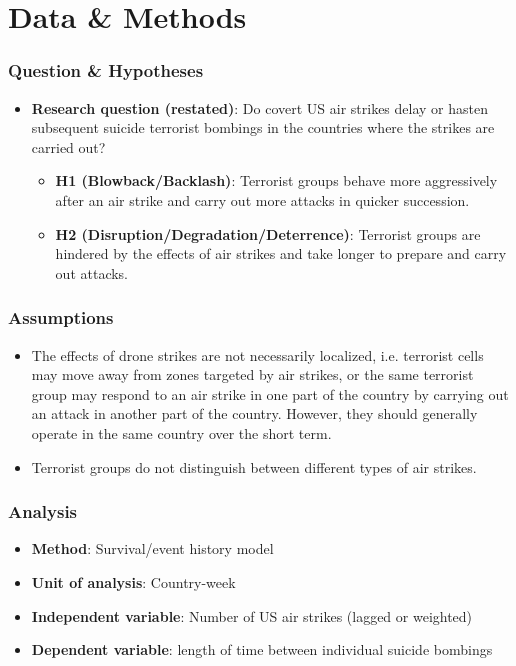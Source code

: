 \documentclass{beamer}
\begin{document}
\section{Data \& Methods}

  \begin{frame}
    \frametitle{Question \& Hypotheses}
    \begin{itemize}
	\item \textbf{Research question (restated)}: Do covert US air strikes delay or hasten subsequent suicide terrorist bombings in the countries where the strikes are carried out?
	\begin{itemize}
		\item \textbf{H1 (Blowback/Backlash)}: Terrorist groups behave more aggressively after an air strike and carry out more attacks in quicker succession.
		\item \textbf{H2 (Disruption/Degradation/Deterrence)}: Terrorist groups are hindered by the effects of air strikes and take longer to prepare and carry out attacks.
	\end{itemize}
     \end{itemize}
  \end{frame}

  \begin{frame}
    \frametitle{Assumptions}
    \begin{itemize}
	\item The effects of drone strikes are not necessarily localized, i.e. terrorist cells may move away from zones targeted by air strikes, or the same terrorist group may respond to an air strike in one part of the country by carrying out an attack in another part of the country. However, they should generally operate in the same country over the short term.
	\item Terrorist groups do not distinguish between different types of air strikes.
     \end{itemize}
  \end{frame}

  \begin{frame}
    \frametitle{Analysis}
    \begin{itemize}
	\item \textbf{Method}: Survival/event history model
	\item \textbf{Unit of analysis}: Country-week
        \item \textbf{Independent variable}: Number of US air strikes (lagged or weighted)
	\item \textbf{Dependent variable}: length of time between individual suicide bombings
     \end{itemize}
  \end{frame}
\end{document}
